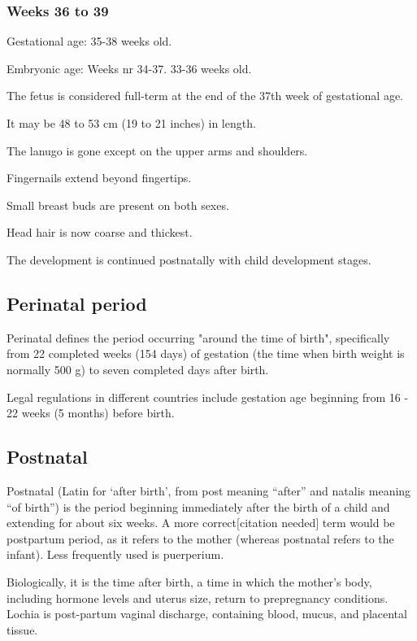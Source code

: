 \documentclass[12pt,a4paper,onecolumn]{article}
\begin{document}
\subsubsection{Weeks 36 to 39}

Gestational age: 35-38 weeks old.

Embryonic age: Weeks nr 34-37. 33-36 weeks old.
\begin{wuxch_item}
    \item The fetus is considered full-term at the end of the 37th week of gestational age.
    \item It may be 48 to 53 cm (19 to 21 inches) in length.
    \item The lanugo is gone except on the upper arms and shoulders.
    \item Fingernails extend beyond fingertips.
    \item Small breast buds are present on both sexes.
    \item Head hair is now coarse and thickest.
    \item The development is continued postnatally with child development stages.
\end{wuxch_item}
\subsection{Perinatal period}
Perinatal defines the period occurring "around the time of birth", specifically from 22 completed
weeks (154 days) of gestation (the time when birth weight is normally 500 g) to seven completed days
after birth. 

Legal regulations in different countries include gestation age beginning from 16 - 22 weeks (5
months) before birth.

\subsection{Postnatal}

Postnatal (Latin for `after birth', from post meaning ``after'' and natalis meaning ``of birth'') is
the period beginning immediately after the birth of a child and extending for about six weeks. A
more correct$[$citation needed$]$ term would be postpartum period, as it refers to the mother
(whereas postnatal refers to the infant). Less frequently used is puerperium.

Biologically, it is the time after birth, a time in which the mother's body, including hormone
levels and uterus size, return to prepregnancy conditions. Lochia is post-partum vaginal discharge,
containing blood, mucus, and placental tissue.
\end{document}
